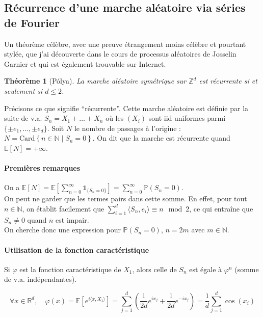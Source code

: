 \documentclass[a4paper, 11pt]{article}
\def\Z{\mathbb{Z}}
\def\N{\mathbb{N}}
\def\P{\mathbb{P}}
\def\R{\mathbb{R}}
\def\E{\mathbb{E}}
\def\Indic{\mathbb{1}}
\newtheorem*{theorem}{Théorème}
\begin{document}
\newpage

\subsection{Récurrence d'une marche aléatoire via séries de Fourier}

Un théorème célèbre, avec une preuve étrangement moins célèbre et pourtant
stylée, que j'ai découverte dans le cours de processus aléatoires de Josselin
Garnier et qui est également trouvable sur Internet.

\begin{theorem}[Pólya]
  La marche aléatoire symétrique sur $\Z^d$ est \emph{récurrente} si et
  seulement si $d \leq 2$.
\end{theorem}

Précisons ce que signifie \enquote{récurrente}. Cette marche aléatoire est
définie par la suite de v.a. $S_n = X_1 + \ldots + X_n$ où les $(X_i)$ sont iid
uniformes parmi $\{\pm e_1, \ldots, \pm e_d\}$. Soit $N$ le nombre de passages à
l'origine : $N = \mathrm{Card}\left\{n \in \N \mid S_n = 0\right\}$. On dit que
la marche est récurrente quand $\E[N] = +\infty$.


\paragraph{Premières remarques} On a $\displaystyle \E[N] = \E\left[
  \sum_{n=0}^\infty \Indic_{\{S_n = 0\}} \right] =
\sum_{n=0}^\infty \P(S_n = 0)$.\\
On peut ne garder que les termes pairs dans cette somme. En effet, pour tout $n
\in \N$, on établit facilement que $\sum_{i=1}^d \langle S_n, e_i \rangle \equiv
n \mod 2$, ce qui entraîne que $S_n \neq 0$ quand $n$ est impair.\\
On cherche donc une expression pour $\P(S_n = 0)$, $n = 2m$ avec $m \in \N$.

\paragraph{Utilisation de la fonction caractéristique}

Si $\varphi$ est la fonction caractéristique de $X_1$, alors celle de $S_n$
est égale à $\varphi^n$ (somme de v.a. indépendantes).

\[ \forall x \in \R^d,\quad \varphi(x) = \E\left[ e^{i \langle x, X_1 \rangle}
  \right]
  = \sum_{j=1}^d \left( \frac{1}{2d}e^{ix_j} + \frac{1}{2d}e^{-ix_j}\right)
  = \frac{1}{d} \sum_{j=1}^d \cos(x_i) \]
\end{document}
